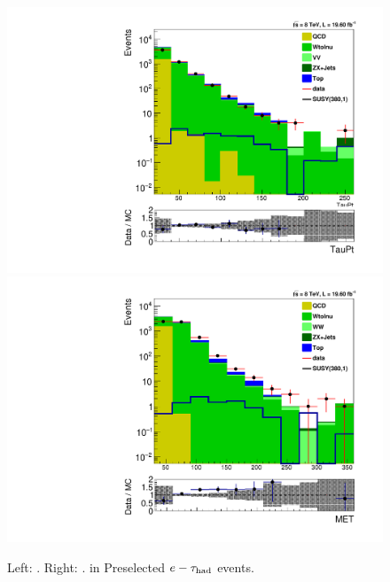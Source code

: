\begin{figure}[htbp]
\centering
\includegraphics[angle=0,scale=0.35]{SelectionEleTau/TauPt.pdf}
\includegraphics[angle=0,scale=0.35]{SelectionEleTau/MET.pdf}
\caption{Left: \Tau\PT. Right: \MET. in Preselected $e-\tau_{\rm had}$ events.}
\label{fig:datamceletau}
\end{figure}

